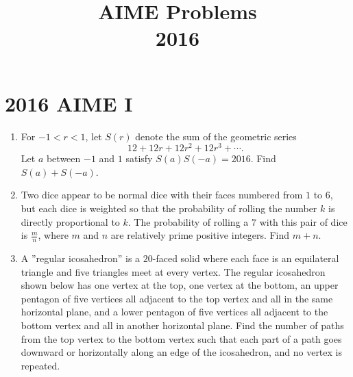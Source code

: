 \documentclass{article}
\title{AIME Problems \\ 2016}
\date{}
\begin{document}
\maketitle\thispagestyle{fancy}\newpage\section*{2016 AIME I}
\begin{enumerate}[label=\arabic*., itemsep=0.5em]
\item For \(-1<r<1\), let \(S(r)\) denote the sum of the geometric series 
\begin{equation*}
12+12r+12r^2+12r^3+\cdots .
\end{equation*}
  Let \(a\) between \(-1\) and \(1\) satisfy \(S(a)S(-a)=2016\). Find \(S(a)+S(-a)\).\par \vspace{0.5em}\item Two dice appear to be normal dice with their faces numbered from \(1\) to \(6\), but each dice is weighted so that the probability of rolling the number \(k\) is directly proportional to \(k\). The probability of rolling a \(7\) with this pair of dice is \(\frac{m}{n}\), where \(m\) and \(n\) are relatively prime positive integers. Find \(m+n\).\par \vspace{0.5em}\item A ''regular icosahedron'' is a \(20\)-faced solid where each face is an equilateral triangle and five triangles meet at every vertex. The regular icosahedron shown below has one vertex at the top, one vertex at the bottom, an upper pentagon of five vertices all adjacent to the top vertex and all in the same horizontal plane, and a lower pentagon of five vertices all adjacent to the bottom vertex and all in another horizontal plane. Find the number of paths from the top vertex to the bottom vertex such that each part of a path goes downward or horizontally along an edge of the icosahedron, and no vertex is repeated.


\end{enumerate}
\end{document}
